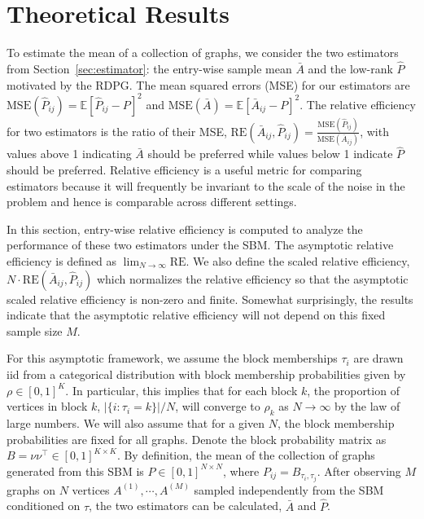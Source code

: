 \documentclass[journal,twoside,web]{ieeecolor}
\newcommand{\Ex}{\mathbb{E}}
\begin{document}


\section{Theoretical Results}
\label{section:theoretical_result}
To estimate the mean of a collection of graphs, we consider the two estimators from Section~\ref{sec:estimator}: the entry-wise sample mean $\bar{A}$ and the low-rank $\hat{P}$ motivated by the RDPG.
The mean squared errors (MSE) for our estimators are $\mathrm{MSE}(\hat{P}_{ij})=\Ex[\hat{P}_{ij}-P]^2$ and $\mathrm{MSE}(\bar{A})=\Ex[\bar{A}_{ij}-P]^2$.
The relative efficiency for two estimators is the ratio of their MSE, $\mathrm{RE}(\bar{A}_{ij},\hat{P}_{ij}) = \frac{\mathrm{MSE}(\hat{P}_{ij})}{\mathrm{MSE}(\bar{A}_{ij})}$, with values above 1 indicating $\bar{A}$ should be preferred while values below 1 indicate $\hat{P}$ should be preferred.
Relative efficiency is a useful metric for comparing estimators because it will frequently be invariant to the scale of the noise in the problem and hence is comparable across different settings.

In this section, entry-wise relative efficiency is computed to analyze the performance of these two estimators under the SBM.
The asymptotic relative efficiency is defined as $\lim_{N\to \infty}\mathrm{RE}$.
We also define the scaled relative efficiency, $N\cdot \mathrm{RE}(\bar{A}_{ij},\hat{P}_{ij})$ which normalizes the relative efficiency so that the asymptotic scaled relative efficiency is non-zero and finite.
Somewhat surprisingly, the results indicate that the asymptotic relative efficiency will not depend on this fixed sample size $M$.


For this asymptotic framework, we assume the block memberships $\tau_i$ are drawn iid from a categorical distribution with block membership probabilities given by $\rho\in[0,1]^K$.
In particular, this implies that for each block $k$, the proportion of vertices in block $k$, $|\{i:\tau_i=k\}|/N$, will converge to $\rho_k$ as $N\to\infty$ by the law of large numbers.
We will also assume that for a given $N$, the block membership probabilities are fixed for all graphs.
Denote the block probability matrix as $B = \nu \nu^{\top} \in [0, 1]^{K \times K}$.
By definition, the mean of the collection of graphs generated from this SBM is $P \in [0, 1]^{N \times N}$, where $P_{ij} = B_{\tau_i, \tau_j}$. After observing $M$ graphs on $N$ vertices $A^{(1)}, \cdots, A^{(M)}$ sampled independently from the SBM conditioned on $\tau$, the two estimators can be calculated, $\bar{A}$ and $\hat{P}$.
\end{document}
